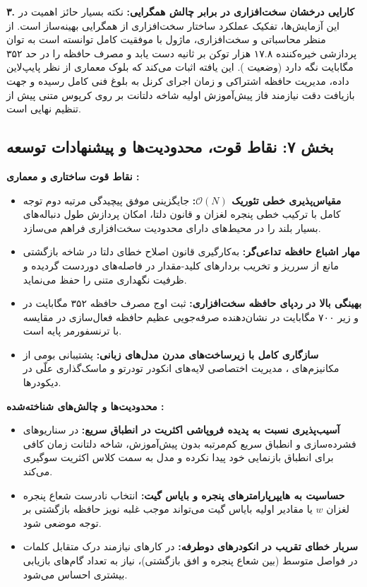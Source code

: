 \textbf{۳. کارایی درخشان سخت‌افزاری در برابر چالش همگرایی:}
نکته بسیار حائز اهمیت در این آزمایش‌ها، تفکیک عملکرد ساختار سخت‌افزاری از همگرایی بهینه‌ساز است. از منظر محاسباتی و سخت‌افزاری، ماژول با موفقیت کامل توانسته است به توان پردازشی خیره‌کننده ۱۷.۸ هزار توکن بر ثانیه دست یابد و مصرف حافظه را در حد ۳۵۲ مگابایت نگه دارد (وضعیت ). این یافته اثبات می‌کند که بلوک معماری  از نظر پایپ‌لاین داده، مدیریت حافظه اشتراکی و زمان اجرای کرنل به بلوغ فنی کامل رسیده و جهت بازیافت دقت نیازمند فاز پیش‌آموزش اولیه شاخه دلتانت بر روی کرپوس متنی پیش از تنظیم نهایی است.

\subsection*{بخش ۷: نقاط قوت، محدودیت‌ها و پیشنهادات توسعه }

\textbf{نقاط قوت ساختاری و معماری :}
\begin{itemize}
    \item \textbf{مقیاس‌پذیری خطی تئوریک $\mathcal{O}(N)$:} جایگزینی موفق پیچیدگی مرتبه دوم توجه کامل با ترکیب خطی پنجره لغزان و قانون دلتا، امکان پردازش طول دنباله‌های بسیار بلند را در محیط‌های دارای محدودیت سخت‌افزاری فراهم می‌سازد.
    \item \textbf{مهار اشباع حافظه تداعی‌گر:} به‌کارگیری قانون اصلاح خطای دلتا در شاخه بازگشتی مانع از سرریز و تخریب بردارهای کلید-مقدار در فاصله‌های دوردست گردیده و ظرفیت نگهداری متنی را حفظ می‌نماید.
    \item \textbf{بهینگی بالا در ردپای حافظه سخت‌افزاری:} ثبت اوج مصرف حافظه ۳۵۲ مگابایت در  و زیر ۷۰۰ مگابایت در  نشان‌دهنده صرفه‌جویی عظیم حافظه فعال‌سازی در مقایسه با ترنسفورمر پایه است.
    \item \textbf{سازگاری کامل با زیرساخت‌های مدرن مدل‌های زبانی:} پشتیبانی بومی از مکانیزم‌های ، مدیریت اختصاصی لایه‌های انکودر تودرتو و ماسک‌گذاری علّی در دیکودرها.
\end{itemize}

\textbf{محدودیت‌ها و چالش‌های شناخته‌شده :}
\begin{itemize}
    \item \textbf{آسیب‌پذیری نسبت به پدیده فروپاشی اکثریت در انطباق سریع:} در سناریوهای فشرده‌سازی و انطباق سریع کم‌مرتبه بدون پیش‌آموزش، شاخه دلتانت زمان کافی برای انطباق بازنمایی خود پیدا نکرده و مدل به سمت کلاس اکثریت سوگیری می‌کند.
    \item \textbf{حساسیت به هایپرپارامترهای پنجره و بایاس گیت:} انتخاب نادرست شعاع پنجره لغزان $w$ یا مقادیر اولیه بایاس گیت می‌تواند موجب غلبه نویز حافظه بازگشتی بر توجه موضعی شود.
    \item \textbf{سربار خطای تقریب در انکودرهای دوطرفه:} در کارهای نیازمند درک متقابل کلمات در فواصل متوسط (بین شعاع پنجره و افق بازگشتی)، نیاز به تعداد گام‌های بازیابی بیشتری احساس می‌شود.
\end{itemize}


